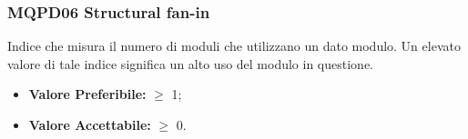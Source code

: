 \subsubsection{MQPD06 Structural fan-in} \label{QualitàDelProdottoManutenibilitàMetricheMQPD06}
Indice che misura il numero di moduli che utilizzano un dato modulo. Un elevato valore di tale indice significa un alto uso del modulo in questione. 
\begin{itemize}
	\item \textbf{Valore Preferibile:} $\geq$ 1;
	\item \textbf{Valore  Accettabile:} $\geq$ 0.
\end{itemize}